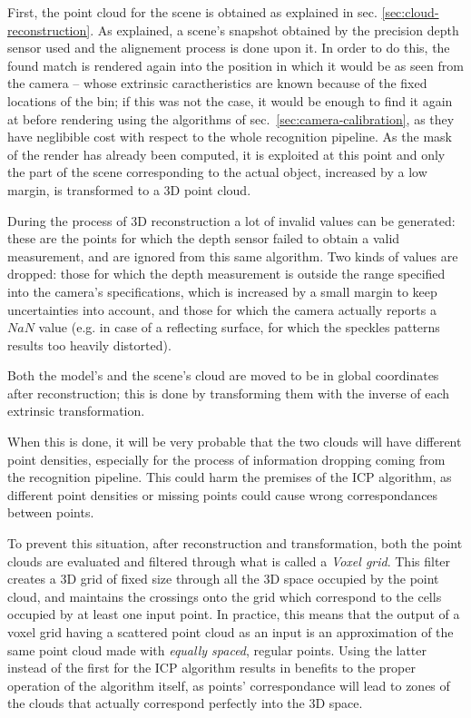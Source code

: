 First, the point cloud for the scene is obtained as explained in sec. \ref{sec:cloud-reconstruction}.
As explained, a scene's snapshot obtained by the precision depth
sensor used and the alignement process is done upon it. In order to
do this, the found match is rendered again into the position in which
it would be as seen from the camera -- whose extrinsic caractheristics
are known because of the fixed locations of the bin; if this was not
the case, it would be enough to find it again at before rendering
using the algorithms of sec.~\ref{sec:camera-calibration}, as they
have neglibible cost with respect to the whole recognition pipeline.
As the mask of the render has already been computed, it is exploited at this
point and only the part of the scene corresponding to the actual
object, increased by a low margin, is
transformed to a 3D point cloud.

During the process of 3D reconstruction a lot of invalid values can be
generated: these are the points for which the depth sensor failed to obtain a
valid measurement, and are ignored from this same algorithm. Two kinds
of values are dropped: those for which the depth measurement is
outside the range specified into the camera's specifications, which
is increased by a small margin to keep uncertainties into account, and
those for which the camera actually reports a $NaN$ value (e.g. in
case of a reflecting surface, for which the speckles patterns results
too heavily distorted).

Both the model's and the scene's cloud are moved to be in global
coordinates after reconstruction; this is done by transforming them
with the inverse of each extrinsic transformation.

When this is done, it will be very probable that the two clouds will
have different point densities, especially for the process of
information dropping coming from the recognition pipeline. This could
harm the premises of the ICP algorithm, as different point densities
or missing points could cause wrong correspondances between points.

To prevent this situation, after reconstruction and transformation,
both the point clouds are evaluated and filtered through what is
called a \emph{Voxel grid}. This filter creates a 3D grid of fixed
size through all the 3D space occupied by the point cloud, and
maintains the crossings onto the grid which correspond to the cells
occupied by at least one input point. In practice, this means that the
output of a voxel grid having a scattered point cloud as an input is
an approximation of the same point cloud made with \emph{equally
  spaced}, regular points. Using the latter instead of the first for
the ICP algorithm results in benefits to the proper
operation of the algorithm itself, as points' correspondance will
lead to zones of the clouds that actually correspond perfectly into the 3D space.

